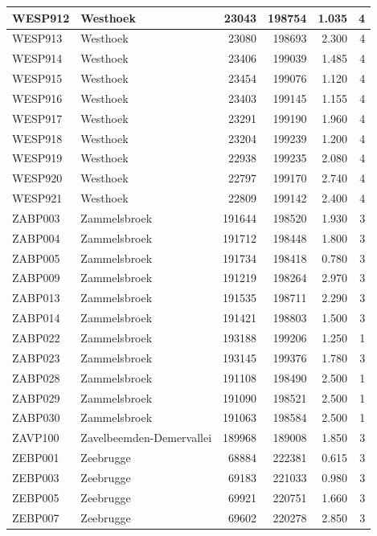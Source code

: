 \documentclass[11pt,]{book}
\begin{document}
\begin{table}
\begin{tabular}[t]{l|l|r|r|r|r}
\hline
WESP912 & Westhoek & 23043 & 198754 & 1.035 & 4\\
\hline
WESP913 & Westhoek & 23080 & 198693 & 2.300 & 4\\
\hline
WESP914 & Westhoek & 23406 & 199039 & 1.485 & 4\\
\hline
WESP915 & Westhoek & 23454 & 199076 & 1.120 & 4\\
\hline
WESP916 & Westhoek & 23403 & 199145 & 1.155 & 4\\
\hline
WESP917 & Westhoek & 23291 & 199190 & 1.960 & 4\\
\hline
WESP918 & Westhoek & 23204 & 199239 & 1.200 & 4\\
\hline
WESP919 & Westhoek & 22938 & 199235 & 2.080 & 4\\
\hline
WESP920 & Westhoek & 22797 & 199170 & 2.740 & 4\\
\hline
WESP921 & Westhoek & 22809 & 199142 & 2.400 & 4\\
\hline
ZABP003 & Zammelsbroek & 191644 & 198520 & 1.930 & 3\\
\hline
ZABP004 & Zammelsbroek & 191712 & 198448 & 1.800 & 3\\
\hline
ZABP005 & Zammelsbroek & 191734 & 198418 & 0.780 & 3\\
\hline
ZABP009 & Zammelsbroek & 191219 & 198264 & 2.970 & 3\\
\hline
ZABP013 & Zammelsbroek & 191535 & 198711 & 2.290 & 3\\
\hline
ZABP014 & Zammelsbroek & 191421 & 198803 & 1.500 & 3\\
\hline
ZABP022 & Zammelsbroek & 193188 & 199206 & 1.250 & 1\\
\hline
ZABP023 & Zammelsbroek & 193145 & 199376 & 1.780 & 3\\
\hline
ZABP028 & Zammelsbroek & 191108 & 198490 & 2.500 & 1\\
\hline
ZABP029 & Zammelsbroek & 191090 & 198521 & 2.500 & 1\\
\hline
ZABP030 & Zammelsbroek & 191063 & 198584 & 2.500 & 1\\
\hline
ZAVP100 & Zavelbeemden-Demervallei & 189968 & 189008 & 1.850 & 3\\
\hline
ZEBP001 & Zeebrugge & 68884 & 222381 & 0.615 & 3\\
\hline
ZEBP003 & Zeebrugge & 69183 & 221033 & 0.980 & 3\\
\hline
ZEBP005 & Zeebrugge & 69921 & 220751 & 1.660 & 3\\
\hline
ZEBP007 & Zeebrugge & 69602 & 220278 & 2.850 & 3\\
\hline

\end{tabular}
\end{table}
\end{document}
